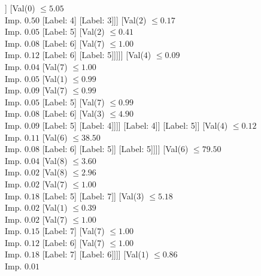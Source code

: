 \documentclass[margin=10pt]{standalone}
\begin{document}
\begin{forest}
					[Val($2$) $ \leq 0.08$ \\ Imp. $0.06$
						[Val($1$) $ \leq 0.91$ \\ Imp. $0.09$
							[Val($6$) $ \leq 8.50$ \\ Imp. $0.08$
								[Label: 4]
								[Label: 6]]
							[Val($0$) $ \leq 5.05$ \\ Imp. $0.50$
								[Label: 4]
								[Label: 3]]]
						[Val($2$) $ \leq 0.17$ \\ Imp. $0.05$
							[Label: 5]
							[Val($2$) $ \leq 0.41$ \\ Imp. $0.08$
								[Label: 6]
								[Val($7$) $ \leq 1.00$ \\ Imp. $0.12$
									[Label: 6]
									[Label: 5]]]]]
					[Val($4$) $ \leq 0.09$ \\ Imp. $0.04$
						[Val($7$) $ \leq 1.00$ \\ Imp. $0.05$
							[Val($1$) $ \leq 0.99$ \\ Imp. $0.09$
								[Val($7$) $ \leq 0.99$ \\ Imp. $0.05$
									[Label: 5]
									[Val($7$) $ \leq 0.99$ \\ Imp. $0.08$
										[Label: 6]
										[Val($3$) $ \leq 4.90$ \\ Imp. $0.09$
											[Label: 5]
											[Label: 4]]]]
								[Label: 4]]
							[Label: 5]]
						[Val($4$) $ \leq 0.12$ \\ Imp. $0.11$
							[Val($6$) $ \leq 38.50$ \\ Imp. $0.08$
								[Label: 6]
								[Label: 5]]
							[Label: 5]]]]
				[Val($6$) $ \leq 79.50$ \\ Imp. $0.04$
					[Val($8$) $ \leq 3.60$ \\ Imp. $0.02$
						[Val($8$) $ \leq 2.96$ \\ Imp. $0.02$
							[Val($7$) $ \leq 1.00$ \\ Imp. $0.18$
								[Label: 5]
								[Label: 7]]
							[Val($3$) $ \leq 5.18$ \\ Imp. $0.02$
								[Val($1$) $ \leq 0.39$ \\ Imp. $0.02$
									[Val($7$) $ \leq 1.00$ \\ Imp. $0.15$
										[Label: 7]
										[Val($7$) $ \leq 1.00$ \\ Imp. $0.12$
											[Label: 6]
											[Val($7$) $ \leq 1.00$ \\ Imp. $0.18$
												[Label: 7]
												[Label: 6]]]]
									[Val($1$) $ \leq 0.86$ \\ Imp. $0.01$

\end{forest}
\end{document}
